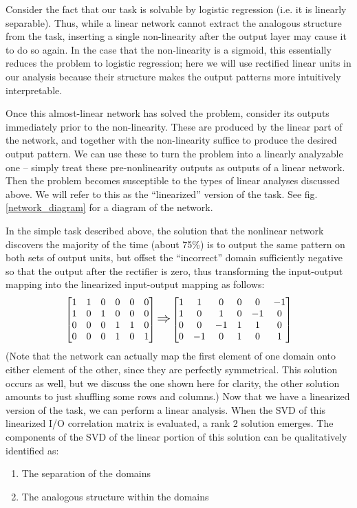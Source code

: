 \documentclass[10pt,letterpaper]{article}
\begin{document}
Consider the fact that our task is solvable by logistic regression (i.e. it is linearly separable). Thus, while a linear network cannot extract the analogous structure from the task, inserting a single non-linearity after the output layer may cause it to do so again. In the case that the non-linearity is a sigmoid, this essentially reduces the problem to logistic regression; here we will use rectified linear units in our analysis because their structure makes the output patterns more intuitively interpretable. \par 
Once this almost-linear network has solved the problem, consider its outputs immediately prior to the non-linearity. These are produced by the linear part of the network, and together with the non-linearity suffice to produce the desired output pattern. We can use these to turn the problem into a linearly analyzable one -- simply treat these pre-nonlinearity outputs as outputs of a linear network. Then the problem becomes susceptible to the types of linear analyses discussed above. We will refer to this as the ``linearized'' version of the task. See fig. \ref{network_diagram} for a diagram of the network. \par 
In the simple task described above, the solution that the nonlinear network discovers the majority of the time (about 75\%) is to output the same pattern on both sets of output units, but offset the ``incorrect'' domain sufficiently negative so that the output after the rectifier is zero, thus transforming the input-output mapping into the linearized input-output mapping as follows:
{ 
\[
\left[ \begin{matrix} 
1 & 1 & 0 & 0 & 0 & 0 \\
1 & 0 & 1 & 0 & 0 & 0 \\
 0 & 0 & 0 & 1 & 1 & 0\\
 0 & 0 & 0 & 1 & 0 & 1\\
\end{matrix}  \right] 
\mathlarger{\mathlarger{\Rightarrow}}
\left[ \begin{matrix} 
1 & 1 & 0 & 0 & 0 & -1 \\
1 & 0 & 1 & 0 & -1 & 0 \\
 0 & 0 & -1 & 1 & 1 & 0\\
 0 & -1 & 0 & 1 & 0 & 1\\
\end{matrix}  \right] 
\] }
(Note that the network can actually map the first element of one domain onto either element of the other, since they are perfectly symmetrical. This solution occurs as well, but we discuss the one shown here for clarity, the other solution amounts to just shuffling some rows and columns.) Now that we have a linearized version of the task, we can perform a linear analysis. When the SVD of this linearized I/O correlation matrix is evaluated, a rank 2 solution emerges. The components of the SVD of the linear portion of this solution can be qualitatively identified as: \begin{enumerate}
\itemsep0em
\item The separation of the domains
\item The analogous structure within the domains
\end{enumerate}
\end{document}
